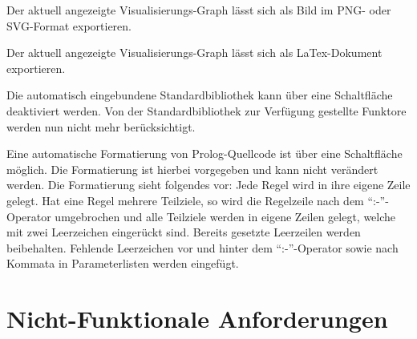 \documentclass[parskip=full,11pt,twoside]{scrartcl}
\begin{document}

Der aktuell angezeigte Visualisierungs-Graph lässt sich als Bild im PNG- oder SVG-Format exportieren.


Der aktuell angezeigte Visualisierungs-Graph lässt sich als LaTex-Dokument exportieren.


Die automatisch eingebundene Standardbibliothek kann über eine Schaltfläche deaktiviert werden. Von der Standardbibliothek zur Verfügung gestellte Funktore werden nun nicht mehr berücksichtigt.


Eine automatische Formatierung von Prolog-Quellcode ist über eine Schaltfläche möglich. Die Formatierung ist hierbei vorgegeben und kann nicht verändert werden. Die Formatierung sieht folgendes vor: Jede Regel wird in ihre eigene Zeile gelegt. Hat eine Regel mehrere Teilziele, so wird die Regelzeile nach dem \enquote{:-}-Operator umgebrochen und alle Teilziele werden in eigene Zeilen gelegt, welche mit zwei Leerzeichen eingerückt sind. Bereits gesetzte Leerzeilen werden beibehalten. Fehlende Leerzeichen vor und hinter dem \enquote{:-}-Operator sowie nach Kommata in Parameterlisten werden eingefügt.



\section{Nicht-Funktionale Anforderungen}


\end{document}

